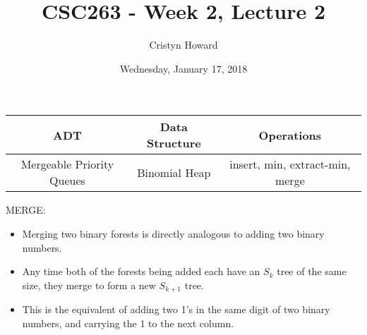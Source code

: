 \documentclass[12pt]{article}
\title{CSC263 - Week 2, Lecture 2}
\author{Cristyn Howard}
\date{Wednesday, January 17, 2018}
\begin{document}
\maketitle


\begin{center}
\begin{tabular}{|c|c|c|}
\hline
ADT & Data Structure & Operations \\
\hline
Mergeable Priority Queues & Binomial Heap & insert, min, extract-min, merge \\
\hline
\end{tabular}
\end{center}
\vspace{0.4cm}

MERGE:
	\begin{itemize}
	\item Merging two binary forests is directly analogous to adding two binary numbers.
	\item Any time both of the forests being added each have an $S_k$ tree of the same size, they merge to form a new $S_{k+1}$ tree. 
	\item This is the equivalent of adding two 1's in the same digit of two binary numbers, and carrying the 1 to the next column.
	\end{itemize}
\end{document}

